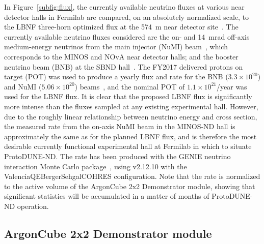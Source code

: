 In Figure~\ref{subfig:flux}, the currently available neutrino fluxes at various near detector halls in Fermilab are compared, on an absolutely normalized scale, to the LBNF three-horn optimized flux at the \SI{574}{\metre} near detector site~\cite{dune_opt_flux}. The currently available neutrino fluxes considered are the on- and \SI{14}{\milli\radian} off-axis medium-energy neutrinos from the main injector (NuMI) beam~\cite{numi}, which corresponds to the MINOS and NOvA near detector halls; and the booster neutrino beam (BNB) at the SBND hall~\cite{Antonello:2015lea}. The FY2017 delivered protons on target (POT) was used to produce a yearly flux and rate for the BNB ($3.3\times 10^{20}$) and NuMI ($5.06\times 10^{20}$) beams~\cite{fnal_beam_2017}, and the nominal POT of $1.1 \times 10^{21}$/year was used for the LBNF flux. It is clear that the proposed LBNF flux is significantly more intense than the fluxes sampled at any existing experimental hall. However, due to the roughly linear relationship between neutrino energy and cross section, the measured rate from the on-axis NuMI beam in the MINOS-ND hall is approximately the same as for the planned LBNF flux, and is therefore the most desirable currently functional experimental hall at Fermilab in which to situate ProtoDUNE-ND. The rate has been produced with the GENIE neutrino interaction Monte Carlo package~\cite{genie}, using v2.12.10 with the ValenciaQEBergerSehgalCOHRES configuration. Note that the rate is normalized to the active volume of the ArgonCube 2x2 Demonstrator module, showing that significant statistics will be accumulated in a matter of months of ProtoDUNE-ND operation.

\FloatBarrier

\subsection{ArgonCube 2x2 Demonstrator module}
\label{sec:2x2-design}

